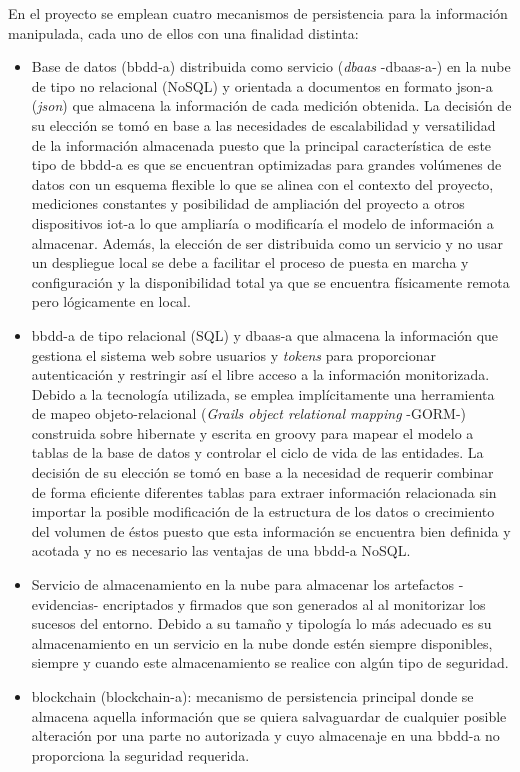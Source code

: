 \documentclass[12pt,a4paper, twoside]{report}
\begin{document}
	En el proyecto se emplean cuatro mecanismos de persistencia para la información manipulada, cada uno de ellos con una finalidad distinta:
	
	\begin{itemize}
		\item Base de datos (\gls{bbdd-a}) distribuida como servicio (\textit{\gls{dbaas}} -\gls{dbaas-a}-) \cite{gonzalez:2011:TCCS} en la nube de tipo no relacional (NoSQL) y orientada a documentos en formato \gls{json-a} (\textit{\gls{json}}) que almacena la información de cada medición obtenida. La decisión de su elección se tomó en base a las necesidades de escalabilidad y versatilidad de la información almacenada puesto que la principal característica de este tipo de \gls{bbdd-a} es que se encuentran optimizadas para grandes volúmenes de datos con un esquema flexible lo que se alinea con el contexto del proyecto, mediciones constantes y posibilidad de ampliación del proyecto a otros dispositivos \gls{iot-a} lo que ampliaría o modificaría el modelo de información a almacenar. Además, la elección de ser distribuida como un servicio y no usar un despliegue local se debe a facilitar el proceso de puesta en marcha y configuración y la disponibilidad total ya que se encuentra físicamente remota pero lógicamente en local.

		\item \gls{bbdd-a} de tipo relacional (SQL) y \gls{dbaas-a} que almacena la información que gestiona el sistema web sobre usuarios y \textit{\glspl{token}} para proporcionar autenticación y restringir así el libre acceso a la información monitorizada. Debido a la tecnología utilizada, se emplea implícitamente una herramienta de mapeo objeto-relacional (\textit{Grails object relational mapping} -GORM-) construida sobre \gls{hibernate} y escrita en \gls{groovy} para mapear el modelo a tablas de la base de datos y controlar el ciclo de vida de las entidades. La decisión de su elección se tomó en base a la necesidad de requerir combinar de forma eficiente diferentes tablas para extraer información relacionada sin importar la posible modificación de la estructura de los datos o crecimiento del volumen de éstos puesto que esta información se encuentra bien definida y acotada y no es necesario las ventajas de una \gls{bbdd-a} NoSQL. 
		 	
		\item Servicio de almacenamiento en la nube para almacenar los artefactos -evidencias- encriptados y firmados que son generados al  al monitorizar los sucesos del entorno. Debido a su tamaño y tipología lo más adecuado es su almacenamiento en un servicio en la nube donde estén siempre disponibles, siempre y cuando este almacenamiento se realice con algún tipo de seguridad.
		
		\item \Gls{blockchain} (\gls{blockchain-a}): mecanismo de persistencia principal donde se almacena aquella información que se quiera salvaguardar de cualquier posible alteración por una parte no autorizada y cuyo almacenaje en una \gls{bbdd-a} no proporciona la seguridad requerida.
	\end{itemize}
	
\end{document}
